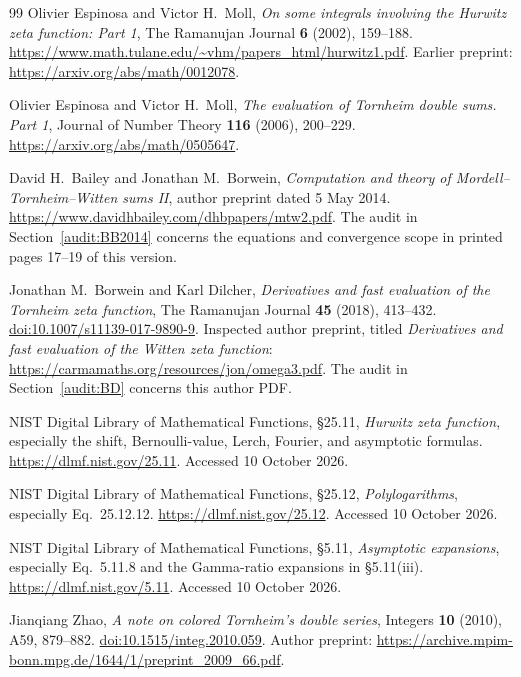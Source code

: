 \documentclass[11pt,a4paper]{article}
\theoremstyle{definition}
\theoremstyle{remark}
\numberwithin{equation}{section}
\begin{document}
\begin{thebibliography}{99}
Olivier Espinosa and Victor H.~Moll,
\emph{On some integrals involving the Hurwitz zeta function: Part 1},
The Ramanujan Journal \textbf{6} (2002), 159--188.
\url{https://www.math.tulane.edu/~vhm/papers_html/hurwitz1.pdf}.
Earlier preprint:
\url{https://arxiv.org/abs/math/0012078}.

Olivier Espinosa and Victor H.~Moll,
\emph{The evaluation of Tornheim double sums. Part 1},
Journal of Number Theory \textbf{116} (2006), 200--229.
\url{https://arxiv.org/abs/math/0505647}.

David H.~Bailey and Jonathan M.~Borwein,
\emph{Computation and theory of Mordell--Tornheim--Witten sums II},
author preprint dated 5 May 2014.
\url{https://www.davidhbailey.com/dhbpapers/mtw2.pdf}.
The audit in Section~\ref{audit:BB2014} concerns the equations and
convergence scope in printed pages 17--19 of this version.

Jonathan M.~Borwein and Karl Dilcher,
\emph{Derivatives and fast evaluation of the Tornheim zeta function},
The Ramanujan Journal \textbf{45} (2018), 413--432.
\href{https://doi.org/10.1007/s11139-017-9890-9}{doi:10.1007/s11139-017-9890-9}.
Inspected author preprint, titled \emph{Derivatives and fast evaluation
of the Witten zeta function}:
\url{https://carmamaths.org/resources/jon/omega3.pdf}.
The audit in Section~\ref{audit:BD} concerns this author PDF.

NIST Digital Library of Mathematical Functions,
\S25.11, \emph{Hurwitz zeta function}, especially the shift,
Bernoulli-value, Lerch, Fourier, and asymptotic formulas.
\url{https://dlmf.nist.gov/25.11}. Accessed 10 October 2026.

NIST Digital Library of Mathematical Functions,
\S25.12, \emph{Polylogarithms}, especially Eq.~25.12.12.
\url{https://dlmf.nist.gov/25.12}. Accessed 10 October 2026.

NIST Digital Library of Mathematical Functions,
\S5.11, \emph{Asymptotic expansions}, especially Eq.~5.11.8
and the Gamma-ratio expansions in \S5.11(iii).
\url{https://dlmf.nist.gov/5.11}. Accessed 10 October 2026.


Jianqiang Zhao, \emph{A note on colored Tornheim's double series},
Integers \textbf{10} (2010), A59, 879--882.
\href{https://doi.org/10.1515/integ.2010.059}{doi:10.1515/integ.2010.059}.
Author preprint:
\url{https://archive.mpim-bonn.mpg.de/1644/1/preprint_2009_66.pdf}.


\end{thebibliography}
\end{document}
